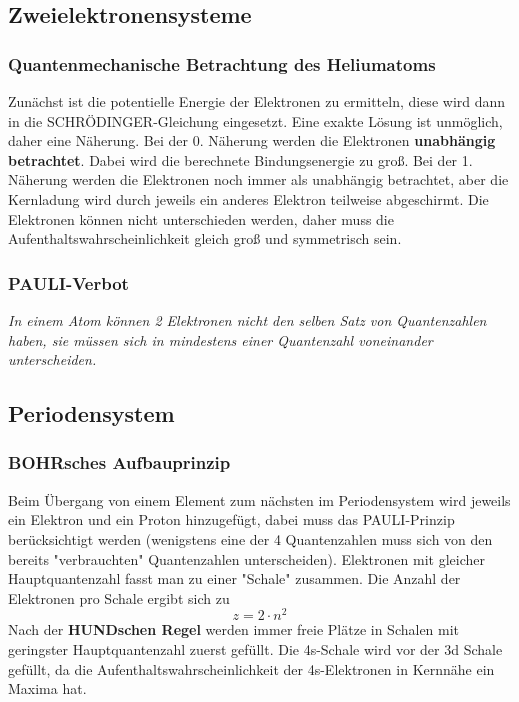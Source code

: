 \documentclass[12pt,a4paper,ngerman]{article}
\begin{document}
\subsection{Zweielektronensysteme}

\subsubsection*{Quantenmechanische Betrachtung des Heliumatoms}
Zunächst ist die potentielle Energie der Elektronen zu ermitteln, diese wird dann in die SCHRÖDINGER-Gleichung eingesetzt. Eine exakte Lösung ist unmöglich, daher eine Näherung. Bei der 0. Näherung werden die Elektronen \textbf{unabhängig betrachtet}. Dabei wird die berechnete Bindungsenergie zu groß. Bei der 1. Näherung werden die Elektronen noch immer als unabhängig betrachtet, aber die Kernladung wird durch jeweils ein anderes Elektron teilweise abgeschirmt. Die Elektronen können nicht unterschieden werden, daher muss die Aufenthaltswahrscheinlichkeit gleich groß und symmetrisch sein.

\subsubsection*{PAULI-Verbot}
\begin{center}\textit{In einem Atom können 2 Elektronen nicht den selben Satz von Quantenzahlen haben, sie müssen sich in mindestens einer Quantenzahl voneinander unterscheiden.}\end{center} 


\subsection{Periodensystem}
\subsubsection*{BOHRsches Aufbauprinzip}
Beim Übergang von einem Element zum nächsten im Periodensystem wird jeweils ein Elektron und ein Proton hinzugefügt, dabei muss das PAULI-Prinzip berücksichtigt werden (wenigstens eine der 4 Quantenzahlen muss sich von den bereits "verbrauchten" Quantenzahlen unterscheiden). Elektronen mit gleicher Hauptquantenzahl fasst man zu einer "Schale" zusammen. 
Die Anzahl der Elektronen pro Schale ergibt sich zu
\begin{equation}
z = 2 \cdot n^2
\end{equation}
Nach der \textbf{HUNDschen Regel} werden immer freie Plätze in Schalen mit geringster Hauptquantenzahl zuerst gefüllt. Die 4s-Schale wird vor der 3d Schale gefüllt, da die Aufenthaltswahrscheinlichkeit der 4s-Elektronen in Kernnähe ein Maxima hat. 
\end{document}
